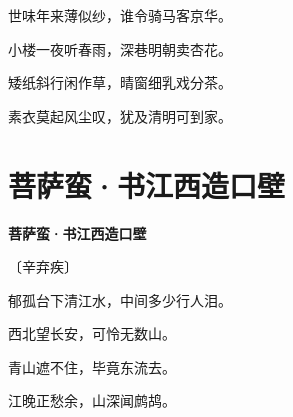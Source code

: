 \documentclass[12pt,UTF-8,openany,fontset=none]{ctexbook}
\begin{document}
    \vspace{18pt}  %

\begin{center}
    \begin{Large}

        世味年来薄似纱，谁令骑马客京华。

        小楼一夜听春雨，深巷明朝卖杏花。

        矮纸斜行闲作草，晴窗细乳戏分茶。

        素衣莫起风尘叹，犹及清明可到家。

    \end{Large}

\end{center}

\vspace{8pt}
\clearpage

\section{菩萨蛮·书江西造口壁}


\begin{center}
    {\bfseries 菩萨蛮·书江西造口壁}

    \vspace{18pt}

    \begin{large}\xuwen
        〔辛弃疾〕
    \end{large}

\end{center}

    \vspace{18pt}  %

\begin{center}
    \begin{Large}

        郁孤台下清江水，中间多少行人泪。

        西北望长安，可怜无数山。

        \vspace{18pt}  %

        青山遮不住，毕竟东流去。

        江晚正愁余，山深闻鹧鸪。

    \end{Large}

\end{center}

\vspace{8pt}
\clearpage
\end{document}
